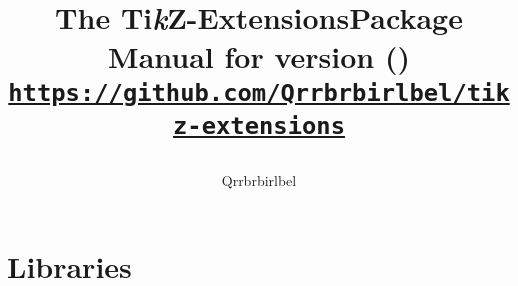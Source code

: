 %
%
%
\newcommand*\tikzextname{Ti\textit kZ-Extensions}


{%
\title{\bfseries The \tikzextname\space Package\\
  \large Manual for version \tikzextversion\space (\tikzextversionnumber)\\[1mm]
\large\href{https://github.com/Qrrbrbirlbel/tikz-extensions}
   {\texttt{https://github.com/Qrrbrbirlbel/tikz-extensions}}
\author{Qrrbrbirlbel}}

\maketitle
\label{table-of-contents}

\tableofcontents
}

%
\part{\tikzname\space Libraries}
\label{part:tikz}

